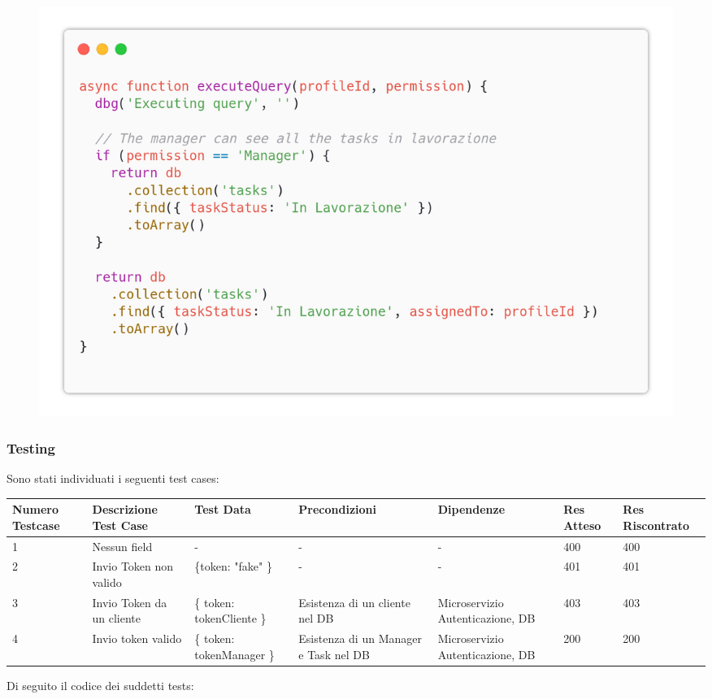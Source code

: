 \documentclass{report}
\begin{document}
\begin{figure}[H]
	\centering\includegraphics[width=1\textwidth]{images/code_in_lavorazione2.png}
\end{figure}

\subsubsection*{Testing}

Sono stati individuati i seguenti test cases:

\begin{center} %
	\centering
	\begin{tabular}{ |p{1cm}|p{2cm}|p{2cm}|p{2cm}|p{2cm}|p{1cm}|p{1cm}| }
		\hline
		Numero Testcase & Descrizione Test Case & Test Data & Precondizioni & Dipendenze & Res Atteso & Res Riscontrato \\
		\hline
		1 & Nessun field & - & - & - & 400 & 400 \\
		\hline
		2 & Invio Token non valido & \{token: "fake" \} & - & - & 401 & 401 \\
		\hline
		3 & Invio Token da un cliente & \{ token: tokenCliente \} & Esistenza di un cliente nel DB & Microservizio Autenticazione, DB & 403 & 403 \\
		\hline
		4 & Invio token valido & \{ token: tokenManager \} & Esistenza di un Manager e Task nel DB & Microservizio Autenticazione, DB & 200 & 200 \\
		\hline
	\end{tabular}
\end{center}

Di seguito il codice dei suddetti tests:
\end{document}
